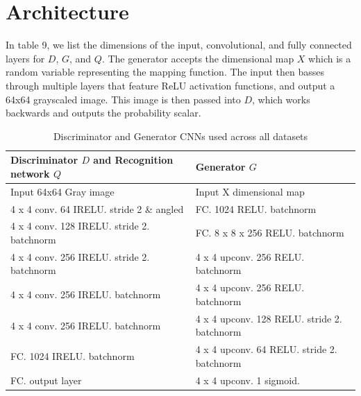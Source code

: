 \documentclass[conference,11pt]{IEEEtran}
\begin{document}
\section{Architecture}

In table 9, we list the dimensions of the input, convolutional, and fully connected layers for $D$, $G$, and $Q$.  The generator accepts the dimensional map $X$ which is a random variable representing the mapping function.  The input then basses through multiple layers that feature ReLU activation functions, and output a 64x64 grayscaled image.  This image is then passed into $D$, which works backwards and outputs the probability scalar.

\begin{table}[!h]
\caption{Discriminator and Generator CNNs used across all datasets}
\centering
    \begin{tabular}{ |p{4cm}|p{4cm}|  }
     \hline
     \textbf{Discriminator} $D$ and \textbf{Recognition network} $Q$ & \textbf{Generator} $G$\\
     \hline
     \hline
     Input 64x64 Gray image &Input X dimensional map\\
     \hline
     4 x 4 conv. 64 IRELU. stride 2 \& angled & FC. 1024 RELU. batchnorm \\
     \hline
     4 x 4 conv. 128 IRELU. stride 2. batchnorm& FC. 8 x 8 x 256 RELU. batchnorm \\
     \hline
     4 x 4 conv. 256 IRELU. stride 2. batchnorm& 4 x 4 upconv. 256 RELU. batchnorm \\
     \hline
     4 x 4 conv. 256 IRELU. batchnorm & 4 x 4 upconv. 256 RELU. batchnorm \\
     \hline
     4 x 4 conv. 256 IRELU. batchnorm &4 x 4 upconv. 128 RELU. stride 2. batchnorm \\
     \hline
     FC. 1024 IRELU. batchnorm&4 x 4 upconv. 64 RELU. stride 2. batchnorm \\
     \hline
     FC. output layer&4 x 4 upconv. 1 sigmoid.\\
     \hline
    \end{tabular}
\end{table}



\end{document}
